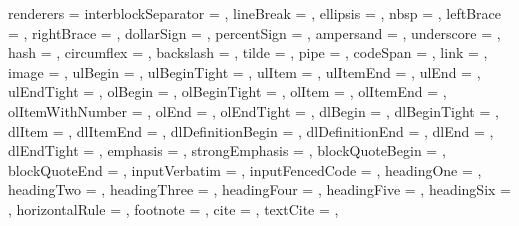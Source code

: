 renderers = {%
  interblockSeparator = {%
    \GOBBLE},
  lineBreak = {%
    \GOBBLE},
  ellipsis = {%
    \GOBBLE},
  nbsp = {%
    \GOBBLE},
  leftBrace = {%
    \GOBBLE},
  rightBrace = {%
    \GOBBLE},
  dollarSign = {%
    \GOBBLE},
  percentSign = {%
    \GOBBLE},
  ampersand = {%
    \GOBBLE},
  underscore = {%
    \GOBBLE},
  hash = {%
    \GOBBLE},
  circumflex = {%
    \GOBBLE},
  backslash = {%
    \GOBBLE},
  tilde = {%
    \GOBBLE},
  pipe = {%
    \GOBBLE},
  codeSpan = {%
    },
  link = {%
    },
  image = {%
    },
  ulBegin = {%
    },
  ulBeginTight = {%
    },
  ulItem = {%
    },
  ulItemEnd = {%
    },
  ulEnd = {%
    },
  ulEndTight = {%
    },
  olBegin = {%
    },
  olBeginTight = {%
    },
  olItem = {%
    },
  olItemEnd = {%
    },
  olItemWithNumber = {%
    },
  olEnd = {%
    },
  olEndTight = {%
    },
  dlBegin = {%
    },
  dlBeginTight = {%
    },
  dlItem = {%
    },
  dlItemEnd = {%
    },
  dlDefinitionBegin = {%
    },
  dlDefinitionEnd = {%
    },
  dlEnd = {%
    },
  dlEndTight = {%
    },
  emphasis = {%
    },
  strongEmphasis = {%
    },
  blockQuoteBegin = {%
    },
  blockQuoteEnd = {%
    },
  inputVerbatim = {%
    },
  inputFencedCode = {%
    },
  headingOne = {%
    },
  headingTwo = {%
    },
  headingThree = {%
    },
  headingFour = {%
    },
  headingFive = {%
    },
  headingSix = {%
    },
  horizontalRule = {%
    },
  footnote = {%
    },
  cite = {%
    },
  textCite = {%
    },
}
